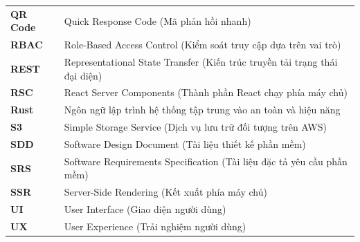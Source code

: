 \begin{flushleft}
\begin{xltabular}{\textwidth}{@{}l X@{}}
\textbf{QR Code} & Quick Response Code (Mã phản hồi nhanh) \\
\textbf{RBAC} & Role-Based Access Control (Kiểm soát truy cập dựa trên vai trò) \\
\textbf{REST} & Representational State Transfer (Kiến trúc truyền tải trạng thái đại diện) \\
\textbf{RSC} & React Server Components (Thành phần React chạy phía máy chủ) \\
\textbf{Rust} & Ngôn ngữ lập trình hệ thống tập trung vào an toàn và hiệu năng \\
\textbf{S3} & Simple Storage Service (Dịch vụ lưu trữ đối tượng trên AWS) \\
\textbf{SDD} & Software Design Document (Tài liệu thiết kế phần mềm) \\
\textbf{SRS} & Software Requirements Specification (Tài liệu đặc tả yêu cầu phần mềm) \\
\textbf{SSR} & Server-Side Rendering (Kết xuất phía máy chủ) \\
\textbf{UI} & User Interface (Giao diện người dùng) \\
\textbf{UX} & User Experience (Trải nghiệm người dùng) \\
\end{xltabular}
\end{flushleft}

